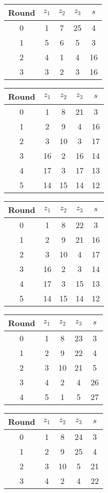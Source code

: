 \begin{multicols}{2}
\begin{tabular}{c | c | c | c | c }
Round & $z_1$ & $z_2$ & $z_3$ & $s$ \\
\hline
0 & 1 & 7 & 25 & 4 \\
1 & 5 & 6 & 5 & 3 \\
2 & 4 & 1 & 4 & 16 \\
3 & 3 & 2 & 3 & 16
\end{tabular}


\begin{tabular}{c | c | c | c | c }
Round & $z_1$ & $z_2$ & $z_3$ & $s$ \\
\hline
0 & 1 & 8 & 21 & 3 \\
1 & 2 & 9 & 4 & 16 \\
2 & 3 & 10 & 3 & 17 \\
3 & 16 & 2 & 16 & 14 \\
4 & 17 & 3 & 17 & 13 \\
5 & 14 & 15 & 14 & 12
\end{tabular}


\begin{tabular}{c | c | c | c | c }
Round & $z_1$ & $z_2$ & $z_3$ & $s$ \\
\hline
0 & 1 & 8 & 22 & 3 \\
1 & 2 & 9 & 21 & 16 \\
2 & 3 & 10 & 4 & 17 \\
3 & 16 & 2 & 3 & 14 \\
4 & 17 & 3 & 15 & 13 \\
5 & 14 & 15 & 14 & 12
\end{tabular}


\begin{tabular}{c | c | c | c | c }
Round & $z_1$ & $z_2$ & $z_3$ & $s$ \\
\hline
0 & 1 & 8 & 23 & 3 \\
1 & 2 & 9 & 22 & 4 \\
2 & 3 & 10 & 21 & 5 \\
3 & 4 & 2 & 4 & 26 \\
4 & 5 & 1 & 5 & 27
\end{tabular}


\begin{tabular}{c | c | c | c | c }
Round & $z_1$ & $z_2$ & $z_3$ & $s$ \\
\hline
0 & 1 & 8 & 24 & 3 \\
1 & 2 & 9 & 25 & 4 \\
2 & 3 & 10 & 5 & 21 \\
3 & 4 & 2 & 4 & 22
\end{tabular}



\end{multicols}
